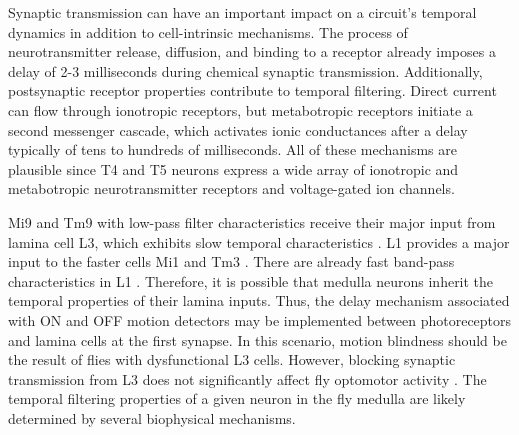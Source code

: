 Synaptic transmission can have an important impact on a circuit's temporal dynamics in addition to cell-intrinsic mechanisms. The process of neurotransmitter release, diffusion, and binding to a receptor already imposes a delay of 2-3 milliseconds during chemical synaptic transmission. Additionally, postsynaptic receptor properties contribute to temporal filtering. Direct current can flow through ionotropic receptors, but metabotropic receptors initiate a second messenger cascade, which activates ionic conductances after a delay typically of tens to hundreds of milliseconds. All of these mechanisms are plausible since T4 and T5 neurons express a wide array of ionotropic and metabotropic neurotransmitter receptors and voltage-gated ion channels. 

Mi9 and Tm9 with low-pass filter characteristics receive their major input from lamina cell L3, which exhibits slow temporal characteristics \parencite{Silies2013}. L1 provides a major input to the faster cells Mi1 and Tm3 \parencite{Takemura2017}. There are already fast band-pass characteristics in L1 \parencite{Clark2011, Reiff2010, Drews2020}. Therefore, it is possible that medulla neurons inherit the temporal properties of their lamina inputs. Thus, the delay mechanism associated with ON and OFF motion detectors may be implemented between photoreceptors and lamina cells at the first synapse. In this scenario, motion blindness should be the result of flies with dysfunctional L3 cells. However, blocking synaptic transmission from L3 does not significantly affect fly optomotor activity \parencite{Bahl2015, Silies2013, Tuthill2013}. The temporal filtering properties of a given neuron in the fly medulla are likely determined by several biophysical mechanisms.


